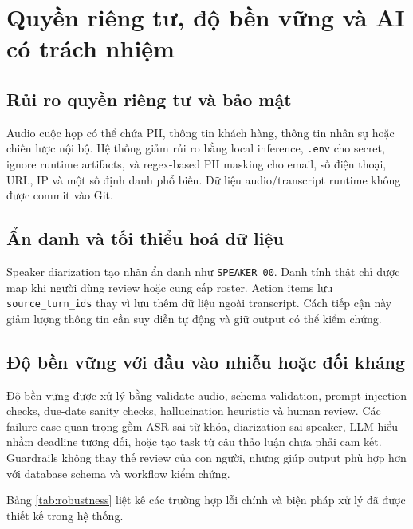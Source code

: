 \chapter{Quyền riêng tư, độ bền vững và AI có trách nhiệm}

\section{Rủi ro quyền riêng tư và bảo mật}

Audio cuộc họp có thể chứa PII, thông tin khách hàng, thông tin nhân sự hoặc chiến lược nội bộ. Hệ thống giảm rủi ro bằng local inference, \texttt{.env} cho secret, ignore runtime artifacts, và regex-based PII masking cho email, số điện thoại, URL, IP và một số định danh phổ biến. Dữ liệu audio/transcript runtime không được commit vào Git.

\section{Ẩn danh và tối thiểu hoá dữ liệu}

Speaker diarization tạo nhãn ẩn danh như \texttt{SPEAKER\_00}. Danh tính thật chỉ được map khi người dùng review hoặc cung cấp roster. Action items lưu \texttt{source\_turn\_ids} thay vì lưu thêm dữ liệu ngoài transcript. Cách tiếp cận này giảm lượng thông tin cần suy diễn tự động và giữ output có thể kiểm chứng.

\section{Độ bền vững với đầu vào nhiễu hoặc đối kháng}

Độ bền vững được xử lý bằng validate audio, schema validation, prompt-injection checks, due-date sanity checks, hallucination heuristic và human review. Các failure case quan trọng gồm ASR sai từ khóa, diarization sai speaker, LLM hiểu nhầm deadline tương đối, hoặc tạo task từ câu thảo luận chưa phải cam kết. Guardrails không thay thế review của con người, nhưng giúp output phù hợp hơn với database schema và workflow kiểm chứng.

Bảng \ref{tab:robustness} liệt kê các trường hợp lỗi chính và biện pháp xử lý đã được thiết kế trong hệ thống.

